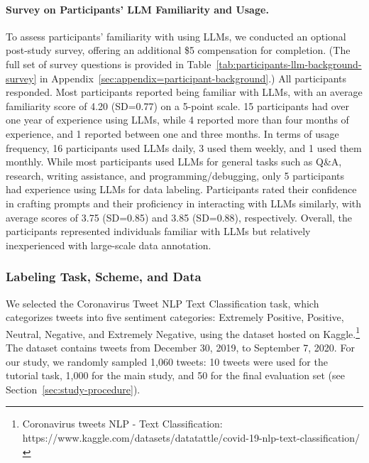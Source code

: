\paragraph{Survey on Participants' LLM Familiarity and Usage.}
To assess participants' familiarity with using LLMs, we conducted an optional post-study survey, offering an additional \$5 compensation for completion. 
(The full set of survey questions is provided in Table~\ref{tab:participants-llm-background-survey} in Appendix~\ref{sec:appendix=participant-background}.) %
All participants responded. %
Most participants reported being familiar with LLMs, with an average familiarity score of 4.20 (SD=0.77) on a 5-point scale. %
15 participants had over one year of experience using LLMs, while 4 reported more than four months of experience, and 1 reported between one and three months. %
In terms of usage frequency, 16 participants used LLMs daily, 3 used them weekly, and 1 used them monthly. %
While most participants used LLMs for general tasks such as Q\&A, research, writing assistance, and programming/debugging, only 5 participants had experience using LLMs for data labeling. %
Participants rated their confidence in crafting prompts and their proficiency in interacting with LLMs similarly, with average scores of 3.75 (SD=0.85) and 3.85 (SD=0.88), respectively. %
Overall, the participants represented individuals familiar with LLMs but relatively inexperienced with large-scale data annotation.



\subsubsection{Labeling Task, Scheme, and Data}
We selected the Coronavirus Tweet NLP Text Classification task, which categorizes tweets into five sentiment categories: Extremely Positive, Positive, Neutral, Negative, and Extremely Negative, using the dataset hosted on Kaggle.\footnote{Coronavirus tweets NLP - Text Classification: https://www.kaggle.com/datasets/datatattle/covid-19-nlp-text-classification/}
The dataset contains tweets from December 30, 2019, to September 7, 2020. 
For our study, we randomly sampled 1,060 tweets: 10 tweets were used for the tutorial task, 1,000 for the main study, and 50 for the final evaluation set (see Section~\ref{sec:study-procedure}).

